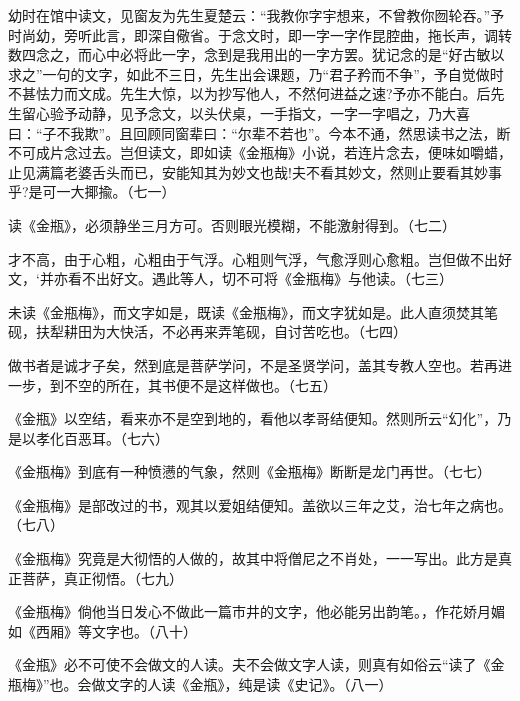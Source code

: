 \begin{showcontents}{}
{幼时在馆中读文，见窗友为先生夏楚云：“我教你字宇想来，不曾教你囫轮吞。”予时尚幼，旁听此言，即深自儆省。于念文时，即一字一字作昆腔曲，拖长声，调转数四念之，而心中必将此一字，念到是我用出的一字方罢。犹记念的是“好古敏以求之”一句的文字，如此不三日，先生出会课题，乃“君子矜而不争”，予自觉做时不甚怯力而文成。先生大惊，以为抄写他人，不然何进益之速?予亦不能白。后先生留心验予动静，见予念文，以头伏桌，一手指文，一字一字唱之，乃大喜曰：“子不我欺”。且回顾同窗辈曰：“尔辈不若也”。今本不通，然思读书之法，断不可成片念过去。岂但读文，即如读《金瓶梅》小说，若连片念去，便味如嚼蜡，止见满篇老婆舌头而已，安能知其为妙文也哉!夫不看其妙文，然则止要看其妙事乎?是可一大揶揄。（七一）

读《金瓶》，必须静坐三月方可。否则眼光模糊，不能激射得到。（七二）

才不高，由于心粗，心粗由于气浮。心粗则气浮，气愈浮则心愈粗。岂但做不出好文，‘并亦看不出好文。遇此等人，切不可将《金瓶梅》与他读。（七三）

未读《金瓶梅》，而文字如是，既读《金瓶梅》，而文字犹如是。此人直须焚其笔砚，扶犁耕田为大快活，不必再来弄笔砚，自讨苦吃也。（七四）

做书者是诚才子矣，然到底是菩萨学问，不是圣贤学问，盖其专教人空也。若再进一步，到不空的所在，其书便不是这样做也。（七五）

《金瓶》以空结，看来亦不是空到地的，看他以孝哥结便知。然则所云“幻化”，乃是以孝化百恶耳。（七六）

《金瓶梅》到底有一种愤懑的气象，然则《金瓶梅》断断是龙门再世。（七七）

《金瓶梅》是部改过的书，观其以爱姐结便知。盖欲以三年之艾，治七年之病也。（七八）

《金瓶梅》究竟是大彻悟的人做的，故其中将僧尼之不肖处，一一写出。此方是真正菩萨，真正彻悟。（七九）

《金瓶梅》倘他当日发心不做此一篇市井的文字，他必能另出韵笔。，作花娇月媚如《西厢》等文字也。（八十）

《金瓶》必不可使不会做文的人读。夫不会做文字人读，则真有如俗云“读了《金瓶梅》”也。会做文字的人读《金瓶》，纯是读《史记》。（八一）

}
\end{showcontents}
